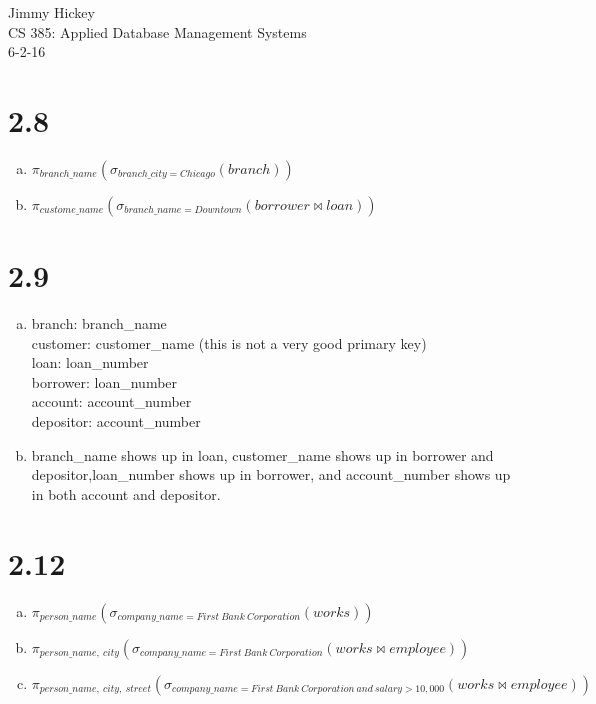 \documentclass[12pt,letterpaper]{article}
\begin{document}
\noindent Jimmy Hickey\\
CS 385: Applied Database Management Systems\\
6-2-16

\section*{2.8}
 \begin{enumerate}[(a)]
 	\item $\pi_{branch\_name}(\sigma_{branch\_city=Chicago}(branch))$
 	
 	\item$\pi_{custome\_name}(\sigma_{branch\_name=Downtown}(borrower\bowtie loan))$
 
 \end{enumerate}

\section*{2.9}
 \begin{enumerate}[(a)]
 	\item branch: branch\_name\\
	 	  customer: customer\_name (this is not a very good primary key)\\
	 	  loan: loan\_number\\
	 	  borrower: loan\_number\\
	 	  account: account\_number\\
	 	  depositor: account\_number
 	
 	\item branch\_name shows up in loan, customer\_name shows up in borrower and depositor,loan\_number shows up in borrower, and account\_number shows up in both account and depositor.
 \end{enumerate}
 
\section*{2.12}
 \begin{enumerate}[(a)]
 	\item $\pi_{person\_name}(\sigma_{company\_name=First\ Bank\ Corporation}(works))$
 	
 	\item$\pi_{person\_name,\ city}(\sigma_{company\_name=First\ Bank\ Corporation}(works \bowtie employee))$
 	
 	\item$\pi_{person\_name,\ city,\ street}(\sigma_{company\_name=First\ Bank\ Corporation\ and\ salary > 10,000}(works \bowtie employee))$
 	
 \end{enumerate}
\clearpage 
\end{document}
